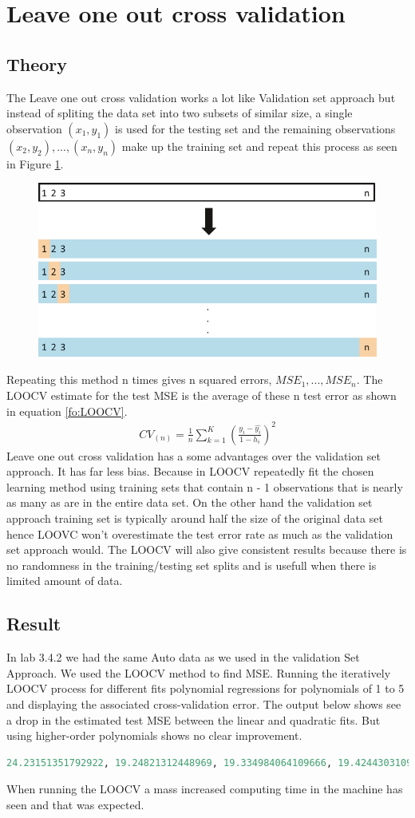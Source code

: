 \section {Leave one out cross validation}
\subsection{Theory}
The Leave one out cross validation works a lot like Validation set approach but instead of spliting the data set into two subsets of
similar size, a single observation $(x_1, y_1)$ is used for the testing set and the remaining observations ${(x_2, y_2), . . . , (x_n, y_n)}$ make up the training set and repeat this process as seen in Figure \ref{fig:loocv}.
\begin{figure}[H]
	\centering
	\includegraphics[width=0.5\linewidth]{crossValidation/LOOCV}
	\caption{}
	\label{fig:loocv}
\end{figure}
Repeating this method n times gives n squared errors, $MSE_1, . . . , MSE_n$. The LOOCV estimate for the test MSE is the average of these n test error as shown in equation \ref{fo:LOOCV}.
\begin{align}\label{fo:LOOCV}
CV_{(n)} = \frac {1}{n} \sum_{k=1}^{K}  (\frac {y_i-\hat{y_i}}{1- h_i})^2
\end{align}
Leave one out cross validation has a some advantages over the validation set approach. It has far less bias. Because in LOOCV repeatedly fit the chosen learning method using training sets that contain n - 1 observations that is nearly as many as are in the entire data set. On the other hand the validation set approach training set is typically around half the size of the original data set hence LOOVC won't overestimate the test error rate as much as the validation set approach would. The LOOCV will also give consistent results because there is no randomness in the training/testing set splits and is usefull when there is limited amount of data.

\subsection{Result}
In lab 3.4.2 we had the same Auto data as we used in the validation Set Approach. We used the LOOCV method to find MSE. 
Running the iteratively LOOCV process for different fits polynomial regressions for polynomials of 1 to 5 and displaying the associated cross-validation error. The output below shows see a drop in the estimated test MSE between the linear and quadratic fits. But using higher-order polynomials shows no clear improvement.
\begin{lstlisting}[language=Python]
24.23151351792922, 19.24821312448969, 19.334984064109666, 19.42443031091358, 19.0332089609506
\end{lstlisting}
When running the LOOCV a mass increased computing time in the machine has seen and that was expected.
